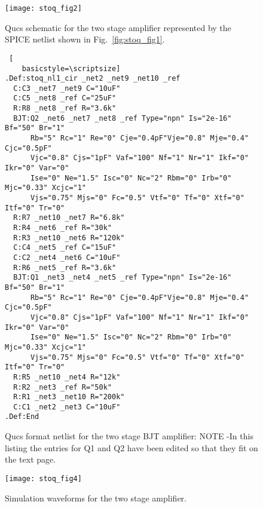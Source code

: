 \FloatBarrier
\begin{figure}
  \centering
  \texttt{[image: stoq\_fig2]}
  \caption{Qucs schematic for the two stage amplifier represented by the SPICE netlist shown in Fig.~\ref{fig:stoq_fig1}.}
  \label{fig:stoq_fig2}
\end{figure} 
\FloatBarrier




\begin{figure}
  \centering
  \begin{lstlisting} [
    basicstyle=\scriptsize]
.Def:stoq_nl1_cir _net2 _net9 _net10 _ref
  C:C3 _net7 _net9 C="10uF"
  C:C5 _net8 _ref C="25uF"
  R:R8 _net8 _ref R="3.6k"
  BJT:Q2 _net6 _net7 _net8 _ref Type="npn" Is="2e-16" Bf="50" Br="1" 
      Rb="5" Rc="1" Re="0" Cje="0.4pF"Vje="0.8" Mje="0.4" Cjc="0.5pF" 
      Vjc="0.8" Cjs="1pF" Vaf="100" Nf="1" Nr="1" Ikf="0" Ikr="0" Var="0"
      Ise="0" Ne="1.5" Isc="0" Nc="2" Rbm="0" Irb="0" Mjc="0.33" Xcjc="1" 
      Vjs="0.75" Mjs="0" Fc="0.5" Vtf="0" Tf="0" Xtf="0" Itf="0" Tr="0"
  R:R7 _net10 _net7 R="6.8k"
  R:R4 _net6 _ref R="30k"
  R:R3 _net10 _net6 R="120k"
  C:C4 _net5 _ref C="15uF"
  C:C2 _net4 _net6 C="10uF"
  R:R6 _net5 _ref R="3.6k"
  BJT:Q1 _net3 _net4 _net5 _ref Type="npn" Is="2e-16" Bf="50" Br="1"
      Rb="5" Rc="1" Re="0" Cje="0.4pF"Vje="0.8" Mje="0.4" Cjc="0.5pF" 
      Vjc="0.8" Cjs="1pF" Vaf="100" Nf="1" Nr="1" Ikf="0" Ikr="0" Var="0"
      Ise="0" Ne="1.5" Isc="0" Nc="2" Rbm="0" Irb="0" Mjc="0.33" Xcjc="1" 
      Vjs="0.75" Mjs="0" Fc="0.5" Vtf="0" Tf="0" Xtf="0" Itf="0" Tr="0"
  R:R5 _net10 _net4 R="12k"
  R:R2 _net3 _ref R="50k"
  R:R1 _net3 _net10 R="200k"
  C:C1 _net2 _net3 C="10uF"
.Def:End
\end{lstlisting} 
  \caption{Qucs format netlist for the two stage BJT amplifier: NOTE -In this listing the entries for Q1 and Q2 have been edited so that they fit on the text page.}
  \label{fig:stoq_fig3}
\end{figure} 


\begin{figure}
  \centering
  \texttt{[image: stoq\_fig4]}
  \caption{Simulation waveforms for the two stage amplifier.}
  \label{fig:stoq_fig4}
\end{figure} 




